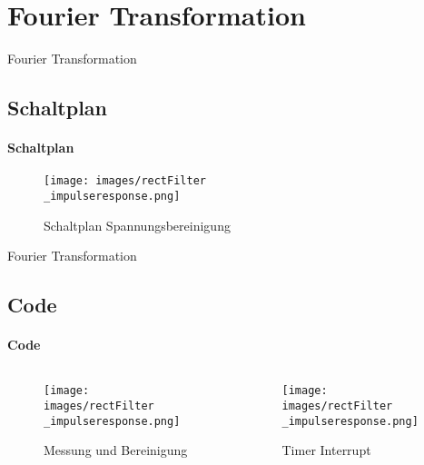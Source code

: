 \section{Fourier Transformation}
\begin{frame}{Fourier Transformation}
	\subsection{Schaltplan}
	\framesubtitle{Schaltplan}
	
	\begin{figure}
		\texttt{[image: images/rectFilter\\\_impulseresponse.png]}
		\caption*{Schaltplan Spannungsbereinigung}
	\end{figure}

\end{frame}



\begin{frame}{Fourier Transformation}
	\subsection{Code}
	\framesubtitle{Code}

	\begin{columns}[T] %
	\begin{column}{0.48\textwidth}
		\begin{figure}
			\texttt{[image: images/rectFilter\\\_impulseresponse.png]}
			\caption*{Messung und Bereinigung}
		\end{figure}
	\end{column}
	\hfill
	\begin{column}{0.48\textwidth}
		\begin{figure}
			\texttt{[image: images/rectFilter\\\_impulseresponse.png]}
			\caption*{Timer Interrupt}
		\end{figure}
	\end{column}
	\end{columns}
	
\end{frame}
